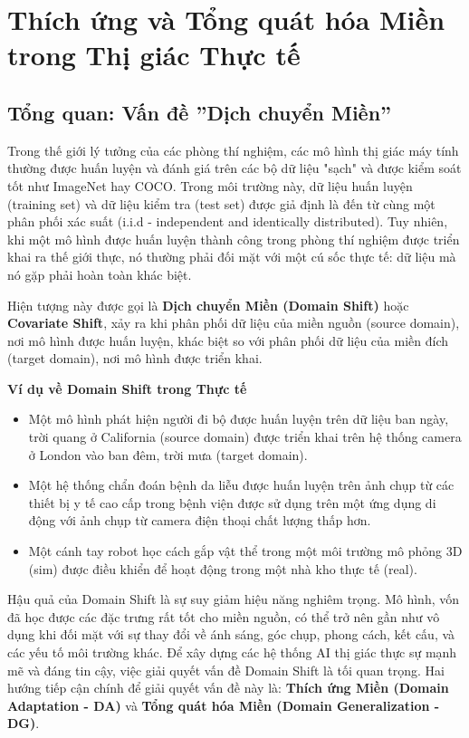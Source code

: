 \section{Thích ứng và Tổng quát hóa Miền trong Thị giác Thực tế}
\label{sec:domain_adaptation_generalization}

\subsection{Tổng quan: Vấn đề ''Dịch chuyển Miền''}
\label{subsec:domain_shift_overview}
Trong thế giới lý tưởng của các phòng thí nghiệm, các mô hình thị giác máy tính thường được huấn luyện và đánh giá trên các bộ dữ liệu "sạch" và được kiểm soát tốt như ImageNet hay COCO. Trong môi trường này, dữ liệu huấn luyện (training set) và dữ liệu kiểm tra (test set) được giả định là đến từ cùng một phân phối xác suất (i.i.d - independent and identically distributed). Tuy nhiên, khi một mô hình được huấn luyện thành công trong phòng thí nghiệm được triển khai ra thế giới thực, nó thường phải đối mặt với một cú sốc thực tế: dữ liệu mà nó gặp phải hoàn toàn khác biệt.

Hiện tượng này được gọi là \textbf{Dịch chuyển Miền (Domain Shift)} hoặc \textbf{Covariate Shift}, xảy ra khi phân phối dữ liệu của miền nguồn (source domain), nơi mô hình được huấn luyện, khác biệt so với phân phối dữ liệu của miền đích (target domain), nơi mô hình được triển khai.

\begin{mdframed}[style=infobox]
	\textbf{Ví dụ về Domain Shift trong Thực tế}
	\begin{itemize}
		\item Một mô hình phát hiện người đi bộ được huấn luyện trên dữ liệu ban ngày, trời quang ở California (source domain) được triển khai trên hệ thống camera ở London vào ban đêm, trời mưa (target domain).
		\item Một hệ thống chẩn đoán bệnh da liễu được huấn luyện trên ảnh chụp từ các thiết bị y tế cao cấp trong bệnh viện được sử dụng trên một ứng dụng di động với ảnh chụp từ camera điện thoại chất lượng thấp hơn.
		\item Một cánh tay robot học cách gắp vật thể trong một môi trường mô phỏng 3D (sim) được điều khiển để hoạt động trong một nhà kho thực tế (real).
	\end{itemize}
\end{mdframed}

Hậu quả của Domain Shift là sự suy giảm hiệu năng nghiêm trọng. Mô hình, vốn đã học được các đặc trưng rất tốt cho miền nguồn, có thể trở nên gần như vô dụng khi đối mặt với sự thay đổi về ánh sáng, góc chụp, phong cách, kết cấu, và các yếu tố môi trường khác. Để xây dựng các hệ thống AI thị giác thực sự mạnh mẽ và đáng tin cậy, việc giải quyết vấn đề Domain Shift là tối quan trọng. Hai hướng tiếp cận chính để giải quyết vấn đề này là: \textbf{Thích ứng Miền (Domain Adaptation - DA)} và \textbf{Tổng quát hóa Miền (Domain Generalization - DG)}.

